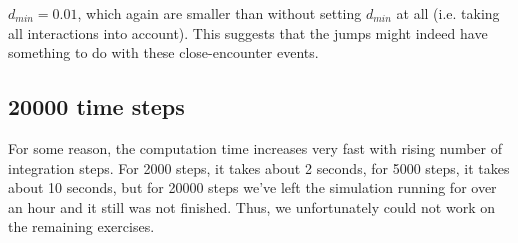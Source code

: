     $d_{min}=0.01$, which again are smaller than without setting $d_{min}$ at 
    all (i.e. taking all interactions into account). This suggests that the 
    jumps might indeed have something to do with these close-encounter 
    events.

\subsection{20000 time steps}
    For some reason, the computation time increases very fast with rising 
    number of integration steps. For 2000 steps, it takes about 2 seconds,
    for 5000 steps, it takes about 10 seconds, but for 20000 steps we've 
    left the simulation running for over an hour and it still was not finished.
    Thus, we unfortunately could not work on the remaining exercises.

